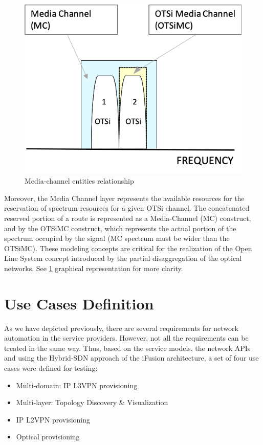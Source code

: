 \documentclass[a4paper,fleqn]{cas-dc}
\begin{document}
\begin{figure}
	\centering
		\includegraphics[scale=0.75]{figs/Media_channel.png}
	\caption{Media-channel entities relationship}
	\label{FIG:Media_channel}
\end{figure}

Moreover, the Media Channel layer represents the available resources for the reservation of spectrum resources for a given OTSi channel. The concatenated reserved portion of a route is represented as a Media-Channel (MC) construct, and by the OTSiMC construct, which represents the actual portion of the spectrum occupied by the signal (MC spectrum must be wider than the OTSiMC). These modeling concepts are critical for the realization of the Open Line System concept introduced by the partial disaggregation of the optical networks. See \cref{FIG:Media_channel} graphical representation for more clarity.


\section{Use Cases Definition}
\label{sec:usecasesdef}
As we have depicted previously, there are several requirements for network automation in the service providers. However, not all the requirements can be treated in the same way. Thus, based on the service models, the network APIs and using the Hybrid-SDN approach of the iFusion architecture, a set of four use cases were defined for testing:

\begin{itemize}
    \item Multi-domain: IP L3VPN provisioning
    \item Multi-layer: Topology Discovery \& Visualization
    \item IP L2VPN provisioning
    \item Optical provisioning
\end{itemize}
\end{document}
